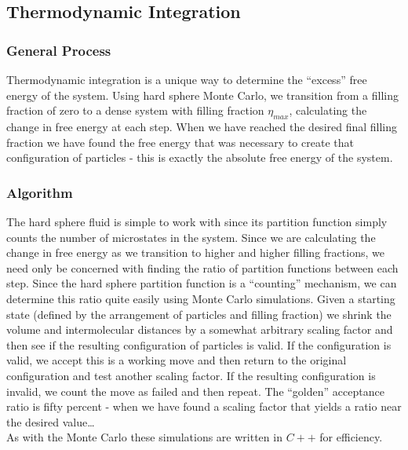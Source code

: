 \documentclass[12pt]{article}
\begin{document}


\subsection{Thermodynamic Integration}
\subsubsection{General Process}
Thermodynamic integration is a unique way to determine the ``excess'' free energy of the system. Using hard sphere Monte Carlo, we transition from a filling fraction of zero to a dense system with filling fraction $\eta_{max}$, calculating the change in free energy at each step. When we have reached the desired final filling fraction we have found the free energy that was necessary to create that configuration of particles - this is exactly the absolute free energy of the system.\\
\subsubsection{Algorithm}
The hard sphere fluid is simple to work with since its partition function simply counts the number of microstates in the system\cite{valeskethesis}. Since we are calculating the change in free energy as we transition to higher and higher filling fractions, we need only be concerned with finding the ratio of partition functions between each step. Since the hard sphere partition function is a ``counting'' mechanism, we can determine this ratio quite easily using Monte Carlo simulations. Given a starting state (defined by the arrangement of particles and filling fraction) we shrink the volume and intermolecular distances by a somewhat arbitrary scaling factor and then see if the resulting configuration of particles is valid. If the configuration is valid, we accept this is a working move and then return to the original configuration and test another scaling factor. If the resulting configuration is invalid, we count the move as failed and then repeat. The ``golden'' acceptance ratio is fifty percent - when we have found a scaling factor that yields a ratio near the desired value\dots\\

As with the Monte Carlo these simulations are written in $C++$ for efficiency. 
\end{document}
